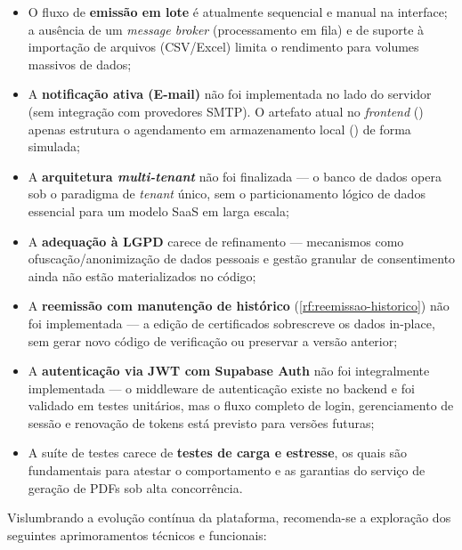 \begin{itemize}
    \item O fluxo de \textbf{emissão em lote} é atualmente sequencial e manual na interface; a ausência de um \textit{message broker} (processamento em fila) e de suporte à importação de arquivos (CSV/Excel) limita o rendimento para volumes massivos de dados;
    \item A \textbf{notificação ativa (E-mail)} não foi implementada no lado do servidor (sem integração com provedores SMTP). O artefato atual no \textit{frontend} () apenas estrutura o agendamento em armazenamento local () de forma simulada;
    \item A \textbf{arquitetura \textit{multi-tenant}} não foi finalizada — o banco de dados opera sob o paradigma de \textit{tenant} único, sem o particionamento lógico de dados essencial para um modelo SaaS em larga escala;
    \item A \textbf{adequação à LGPD} carece de refinamento — mecanismos como ofuscação/anonimização de dados pessoais e gestão granular de consentimento ainda não estão materializados no código;
    \item A \textbf{reemissão com manutenção de histórico} (\ref{rf:reemissao-historico}) não foi implementada — a edição de certificados sobrescreve os dados in-place, sem gerar novo código de verificação ou preservar a versão anterior;
    \item A \textbf{autenticação via JWT com Supabase Auth} não foi integralmente implementada — o middleware de autenticação existe no backend e foi validado em testes unitários, mas o fluxo completo de login, gerenciamento de sessão e renovação de tokens está previsto para versões futuras;
    \item A suíte de testes carece de \textbf{testes de carga e estresse}, os quais são fundamentais para atestar o comportamento e as garantias do serviço de geração de PDFs sob alta concorrência.
\end{itemize}


Vislumbrando a evolução contínua da plataforma, recomenda-se a exploração dos seguintes aprimoramentos técnicos e funcionais:


